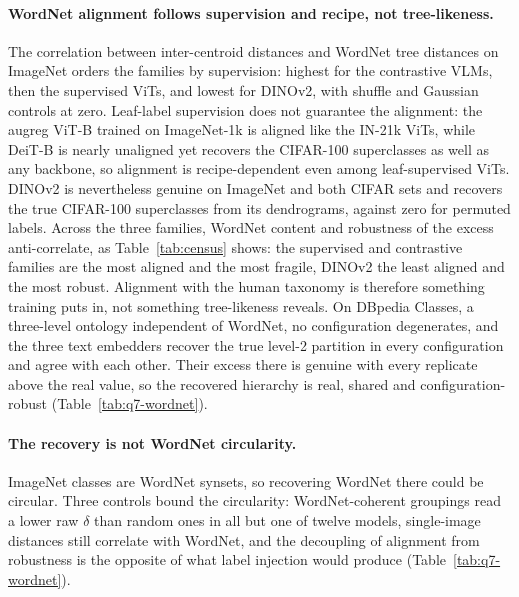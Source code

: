 \documentclass{article}
\theoremstyle{definition}
\begin{document}
\paragraph{WordNet alignment follows supervision and recipe, not tree-likeness.} The correlation between inter-centroid distances and WordNet tree distances on ImageNet orders the families by supervision: highest for the contrastive VLMs, then the supervised ViTs, and lowest for DINOv2, with shuffle and Gaussian controls at zero. Leaf-label supervision does not guarantee the alignment: the augreg ViT-B trained on ImageNet-1k is aligned like the IN-21k ViTs, while DeiT-B is nearly unaligned yet recovers the CIFAR-100 superclasses as well as any backbone, so alignment is recipe-dependent even among leaf-supervised ViTs. DINOv2 is nevertheless genuine on ImageNet and both CIFAR sets and recovers the true CIFAR-100 superclasses from its dendrograms, against zero for permuted labels. Across the three families, WordNet content and robustness of the excess anti-correlate, as Table~\ref{tab:census} shows: the supervised and contrastive families are the most aligned and the most fragile, DINOv2 the least aligned and the most robust. Alignment with the human taxonomy is therefore something training puts in, not something tree-likeness reveals. On DBpedia Classes, a three-level ontology independent of WordNet, no configuration degenerates, and the three text embedders recover the true level-2 partition in every configuration and agree with each other. Their excess there is genuine with every replicate above the real value, so the recovered hierarchy is real, shared and configuration-robust (Table~\ref{tab:q7-wordnet}). %

\paragraph{The recovery is not WordNet circularity.} ImageNet classes are WordNet synsets, so recovering WordNet there could be circular. Three controls bound the circularity: WordNet-coherent groupings read a lower raw $\delta$ than random ones in all but one of twelve models, single-image distances still correlate with WordNet, and the decoupling of alignment from robustness is the opposite of what label injection would produce (Table~\ref{tab:q7-wordnet}). %
\end{document}
